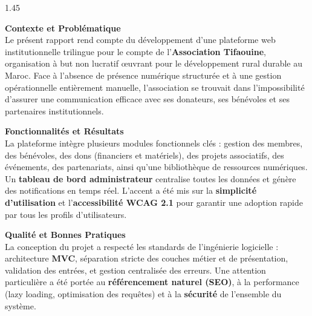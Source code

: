 \documentclass[12pt,a4paper,twoside,openright]{report}
\begin{document}
\begin{spacing}{1.45}
\begin{minipage}{0.9\textwidth}

    {\large\bfseries\color{deepBlue} Contexte et Problématique}\\[8pt]
    Le présent rapport rend compte du développement d'une plateforme web institutionnelle trilingue pour le compte de l'\textbf{Association Tifaouine}, organisation à but non lucratif œuvrant pour le développement rural durable au Maroc. Face à l'absence de présence numérique structurée et à une gestion opérationnelle entièrement manuelle, l'association se trouvait dans l'impossibilité d'assurer une communication efficace avec ses donateurs, ses bénévoles et ses partenaires institutionnels. 

    \vspace{0.45cm}

    {\large\bfseries\color{deepBlue} Fonctionnalités et Résultats}\\[8pt]
    La plateforme intègre plusieurs modules fonctionnels clés : gestion des membres, des bénévoles, des dons (financiers et matériels), des projets associatifs, des événements, des partenariats, ainsi qu'une bibliothèque de ressources numériques. Un \textbf{tableau de bord administrateur} centralise toutes les données et génère des notifications en temps réel. L'accent a été mis sur la \textbf{simplicité d'utilisation} et l'\textbf{accessibilité WCAG 2.1} pour garantir une adoption rapide par tous les profils d'utilisateurs.

    \vspace{0.45cm}

    {\large\bfseries\color{deepBlue} Qualité et Bonnes Pratiques}\\[8pt]
    La conception du projet a respecté les standards de l'ingénierie logicielle : architecture \textbf{MVC}, séparation stricte des couches métier et de présentation, validation des entrées, et gestion centralisée des erreurs. Une attention particulière a été portée au \textbf{référencement naturel (SEO)}, à la performance (lazy loading, optimisation des requêtes) et à la \textbf{sécurité} de l'ensemble du système.

\end{minipage}
\end{spacing}

\vfill
\end{document}
